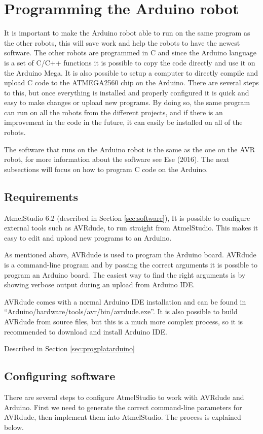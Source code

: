 \section{Programming the Arduino robot}
It is important to make the Arduino robot able to run on the same program as the other robots, this will save work and help the robots to have the newest software. The other robots are programmed in C and since the Arduino language is a set of C/C++ functions it is possible to copy the code directly and use it on the Arduino Mega. It is also possible to setup a computer to directly compile and upload C code to the ATMEGA2560 chip on the Arduino. There are several steps to this, but once everything is installed and properly configured it is quick and easy to make changes or upload new programs. By doing so, the same program can run on all the robots from the different projects, and if there is an improvement in the code in the future, it can easily be installed on all of the robots.

The software that runs on the Arduino robot is the same as the one on the AVR robot, for more information about the software see Ese (2016). The next subsections will focus on how to program C code on the Arduino.
\subsection{Requirements}
AtmelStudio 6.2 (described in Section \ref{sec:software}), It is possible to configure external tools such as AVRdude, to run straight from AtmelStudio. This makes it easy to edit and upload new programs to an Arduino.

As mentioned above, AVRdude is used to program the Arduino board. AVRdude is a command-line program and by passing the correct arguments it is possible to program an Arduino board. The easiest way to find the right arguments is by showing verbose output during an upload from Arduino IDE.

AVRdude comes with a normal Arduino IDE installation and can be found in ``Arduino/hardware/tools/avr/bin/avrdude.exe''. It is also possible to build AVRdude from source files, but this is a much more complex process, so it is recommended to download and install Arduino IDE.

Described in Section \ref{sec:progplatarduino}

\subsection{Configuring software}
There are several steps to configure AtmelStudio to work with AVRdude and Arduino. First we need to generate the correct command-line parameters for AVRdude, then implement them into AtmelStudio. The process is explained below.

